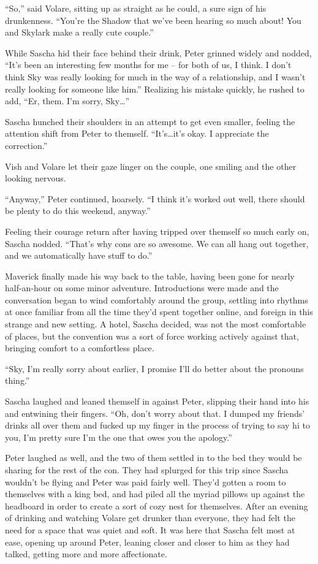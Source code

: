 ``So,'' said Volare, sitting up as straight as he could, a sure sign of his drunkenness. ``You're the Shadow that we've been hearing so much about! You and Skylark make a really cute couple.''

While Sascha hid their face behind their drink, Peter grinned widely and nodded, ``It's been an interesting few months for me -- for both of us, I think. I don't think Sky was really looking for much in the way of a relationship, and I wasn't really looking for someone like him.'' Realizing his mistake quickly, he rushed to add, ``Er, them. I'm sorry, Sky\ldots{}''

Sascha hunched their shoulders in an attempt to get even smaller, feeling the attention shift from Peter to themself. ``It's\ldots{}it's okay. I appreciate the correction.''

Vish and Volare let their gaze linger on the couple, one smiling and the other looking nervous.

``Anyway,'' Peter continued, hoarsely. ``I think it's worked out well, there should be plenty to do this weekend, anyway.''

Feeling their courage return after having tripped over themself so much early on, Sascha nodded. ``That's why cons are so awesome. We can all hang out together, and we automatically have stuff to do.''

Maverick finally made his way back to the table, having been gone for nearly half-an-hour on some minor adventure. Introductions were made and the conversation began to wind comfortably around the group, settling into rhythms at once familiar from all the time they'd spent together online, and foreign in this strange and new setting. A hotel, Sascha decided, was not the most comfortable of places, but the convention was a sort of force working actively against that, bringing comfort to a comfortless place.

\secdiv

``Sky, I'm really sorry about earlier, I promise I'll do better about the pronouns thing.''

Sascha laughed and leaned themself in against Peter, slipping their hand into his and entwining their fingers. ``Oh, don't worry about that. I dumped my friends' drinks all over them and fucked up my finger in the process of trying to say hi to you, I'm pretty sure I'm the one that owes you the apology.''

Peter laughed as well, and the two of them settled in to the bed they would be sharing for the rest of the con. They had splurged for this trip since Sascha wouldn't be flying and Peter was paid fairly well. They'd gotten a room to themselves with a king bed, and had piled all the myriad pillows up against the headboard in order to create a sort of cozy nest for themselves. After an evening of drinking and watching Volare get drunker than everyone, they had felt the need for a space that was quiet and soft. It was here that Sascha felt most at ease, opening up around Peter, leaning closer and closer to him as they had talked, getting more and more affectionate.

